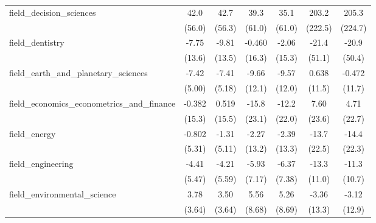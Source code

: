 \begin{tabular}{lcccccc}
   field\_decision\_sciences                                   & 42.0          & 42.7          & 39.3           & 35.1           & 203.2       & 205.3\\   
                                                               & (56.0)        & (56.3)        & (61.0)         & (61.0)         & (222.5)     & (224.7)\\   
   field\_dentistry                                            & -7.75         & -9.81         & -0.460         & -2.06          & -21.4       & -20.9\\   
                                                               & (13.6)        & (13.5)        & (16.3)         & (15.3)         & (51.1)      & (50.4)\\   
   field\_earth\_and\_planetary\_sciences                      & -7.42         & -7.41         & -9.66          & -9.57          & 0.638       & -0.472\\   
                                                               & (5.00)        & (5.18)        & (12.1)         & (12.0)         & (11.5)      & (11.7)\\   
   field\_economics\_econometrics\_and\_finance                & -0.382        & 0.519         & -15.8          & -12.2          & 7.60        & 4.71\\   
                                                               & (15.3)        & (15.5)        & (23.1)         & (22.0)         & (23.6)      & (22.7)\\   
   field\_energy                                               & -0.802        & -1.31         & -2.27          & -2.39          & -13.7       & -14.4\\   
                                                               & (5.31)        & (5.11)        & (13.2)         & (13.3)         & (22.5)      & (22.3)\\   
   field\_engineering                                          & -4.41         & -4.21         & -5.93          & -6.37          & -13.3       & -11.3\\   
                                                               & (5.47)        & (5.59)        & (7.17)         & (7.38)         & (11.0)      & (10.7)\\   
   field\_environmental\_science                               & 3.78          & 3.50          & 5.56           & 5.26           & -3.36       & -3.12\\   
                                                               & (3.64)        & (3.64)        & (8.68)         & (8.69)         & (13.3)      & (12.9)\\   

\end{tabular}
